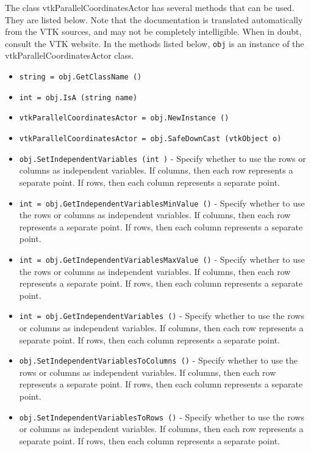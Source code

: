 The class vtkParallelCoordinatesActor has several methods that can be used.
  They are listed below.
Note that the documentation is translated automatically from the VTK sources,
and may not be completely intelligible.  When in doubt, consult the VTK website.
In the methods listed below, \verb|obj| is an instance of the vtkParallelCoordinatesActor class.
\begin{itemize}
\item  \verb|string = obj.GetClassName ()|

\item  \verb|int = obj.IsA (string name)|

\item  \verb|vtkParallelCoordinatesActor = obj.NewInstance ()|

\item  \verb|vtkParallelCoordinatesActor = obj.SafeDownCast (vtkObject o)|

\item  \verb|obj.SetIndependentVariables (int )| -  Specify whether to use the rows or columns as independent variables.
 If columns, then each row represents a separate point. If rows, then 
 each column represents a separate point.

\item  \verb|int = obj.GetIndependentVariablesMinValue ()| -  Specify whether to use the rows or columns as independent variables.
 If columns, then each row represents a separate point. If rows, then 
 each column represents a separate point.

\item  \verb|int = obj.GetIndependentVariablesMaxValue ()| -  Specify whether to use the rows or columns as independent variables.
 If columns, then each row represents a separate point. If rows, then 
 each column represents a separate point.

\item  \verb|int = obj.GetIndependentVariables ()| -  Specify whether to use the rows or columns as independent variables.
 If columns, then each row represents a separate point. If rows, then 
 each column represents a separate point.

\item  \verb|obj.SetIndependentVariablesToColumns ()| -  Specify whether to use the rows or columns as independent variables.
 If columns, then each row represents a separate point. If rows, then 
 each column represents a separate point.

\item  \verb|obj.SetIndependentVariablesToRows ()| -  Specify whether to use the rows or columns as independent variables.
 If columns, then each row represents a separate point. If rows, then 
 each column represents a separate point.


\end{itemize}
